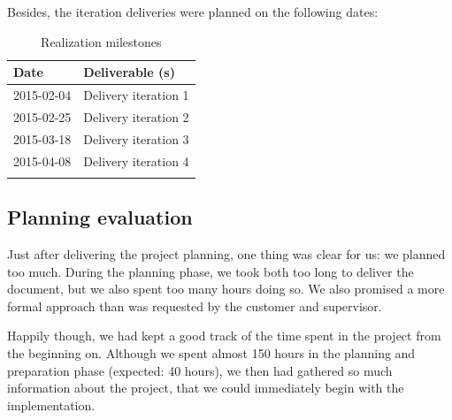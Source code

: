 %
Besides, the iteration deliveries were planned on the following dates:
\begin{longtable}{|l|l|}\hline
    \textbf{Date} & \textbf{Deliverable (s)} \\\hline
	\endhead
    2015-02-04 & Delivery iteration 1\\\hline
    2015-02-25 & Delivery iteration 2\\\hline
    2015-03-18 & Delivery iteration 3\\\hline
    2015-04-08 & Delivery iteration 4\\\hline
  \caption{Realization milestones}
  \label{tab:realization-milestones}
\end{longtable}


\subsection{Planning evaluation}
Just after delivering the project planning, one thing was clear for us: we planned too much.
During the planning phase, we took both too long to deliver the document, but we also spent too many hours doing so.
We also promised a more formal approach than was requested by the customer and supervisor.

Happily though, we had kept a good track of the time spent in the project from the beginning on.
Although we spent almost 150 hours in the planning and preparation phase (expected: 40 hours), we then had gathered so much information about the project, that we could immediately begin with the implementation.


